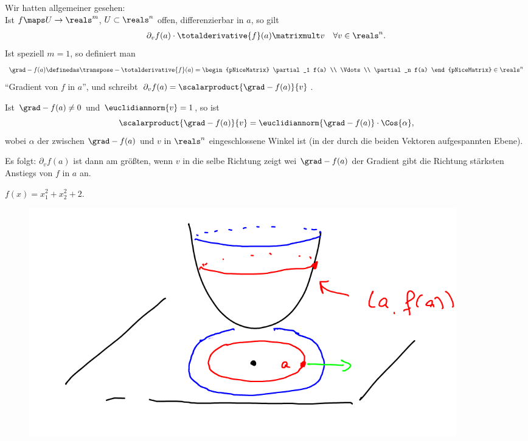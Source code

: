 \begin{bemdef}
    Wir hatten allgemeiner gesehen:\\
    Ist \( f\maps U\to \reals^m \), \( U\subset \reals^n \) offen, differenzierbar in \( a \), so gilt
    \begin{align*}
        \partial_v f(a)\cdot \totalderivative{f}(a)\matrixmult v\quad \forall v\in \reals^n.
    \end{align*}
    Ist speziell \( m=1 \), so definiert man
    \begin{align*}
        \grad-{f(a)}\definedas \transpose-{\totalderivative{f}(a)}=\begin{pNiceMatrix} \partial_1 f(a) \\ \Vdots \\ \partial_n f(a) \end{pNiceMatrix}\in \reals^n
    \end{align*}
    \enquote{Gradient von \( f \) in \( a \)}, und schreibt \( \partial_v f(a)=\scalarproduct{\grad-{f(a)}}{v} \).

    Ist \( \grad-{f(a)}\neq 0 \) und \( \euclidiannorm{v}=1 \), so ist
    \begin{equation*}
        \scalarproduct{\grad-{f(a)}}{v}=\euclidiannorm{\grad-{f(a)}}\cdot\Cos{\alpha},
    \end{equation*}
    wobei \( \alpha \) der zwischen \( \grad-{f(a)} \) und \( v \) in \( \reals^n \) eingeschlossene Winkel ist (in der durch die beiden Vektoren aufgespannten Ebene).

    Es folgt: \( \partial_v f(a) \) ist dann am größten, wenn \( v \) in die selbe Richtung zeigt wei \( \grad-{f(a)} \) \timplies der Gradient gibt die Richtung stärksten Anstiegs von \( f \) in \( a \) an.
\end{bemdef}
\begin{beispiel*}
    \( f(x)=x_1^2+x_2^2+2 \).
    \begin{figure}[H]
        \centering
        \includegraphics[width=0.5\linewidth]{figures/gradient_beispiel_parabel}
        \label{fig:gradient_beispiel_parabel}
    \end{figure}
\end{beispiel*}

